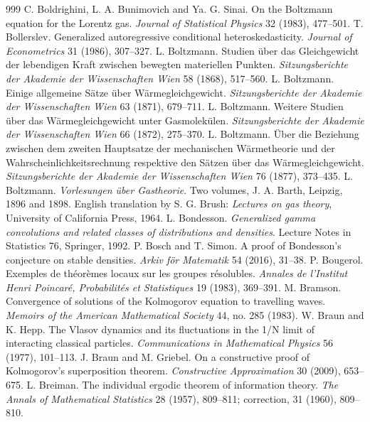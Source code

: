 \begin{thebibliography}{999}
 C. Boldrighini, L. A. Bunimovich and Ya. G. Sinai. On the Boltzmann equation for the Lorentz gas. \emph{Journal of Statistical Physics} 32 (1983), 477--501.
 T. Bollerslev. Generalized autoregressive conditional heteroskedasticity. \emph{Journal of Econometrics} 31 (1986), 307--327.
 L. Boltzmann. Studien \"uber das Gleichgewicht der lebendigen Kraft zwischen bewegten materiellen Punkten. \emph{Sitzungsberichte der Akademie der Wissenschaften Wien} 58 (1868), 517--560.
 L. Boltzmann. Einige allgemeine S\"atze \"uber W\"armegleichgewicht. \emph{Sitzungsberichte der Akademie der Wissenschaften Wien} 63 (1871), 679--711.
 L. Boltzmann. Weitere Studien \"uber das W\"armegleichgewicht unter Gasmolek\"ulen. \emph{Sitzungsberichte der Akademie der Wissenschaften Wien} 66 (1872), 275--370.
 L. Boltzmann. \"Uber die Beziehung zwischen dem zweiten Hauptsatze der mechanischen W\"armetheorie und der Wahrscheinlichkeitsrechnung respektive den S\"atzen \"uber das W\"armegleichgewicht. \emph{Sitzungsberichte der Akademie der Wissenschaften Wien} 76 (1877), 373--435.
 L. Boltzmann. \emph{Vorlesungen \"uber Gastheorie}. Two volumes, J. A. Barth, Leipzig, 1896 and 1898. English translation by S. G. Brush: \emph{Lectures on gas theory}, University of California Press, 1964.
 L. Bondesson. \emph{Generalized gamma convolutions and related classes of distributions and densities}. Lecture Notes in Statistics 76, Springer, 1992.
 P. Bosch and T. Simon. A proof of Bondesson's conjecture on stable densities. \emph{Arkiv f\"or Matematik} 54 (2016), 31--38.
 P. Bougerol. Exemples de th\'eor\`emes locaux sur les groupes r\'esolubles. \emph{Annales de l'Institut Henri Poincar\'e, Probabilit\'es et Statistiques} 19 (1983), 369--391.
 M. Bramson. Convergence of solutions of the Kolmogorov equation to travelling waves. \emph{Memoirs of the American Mathematical Society} 44, no. 285 (1983).
 W. Braun and K. Hepp. The Vlasov dynamics and its fluctuations in the 1/N limit of interacting classical particles. \emph{Communications in Mathematical Physics} 56 (1977), 101--113.
 J. Braun and M. Griebel. On a constructive proof of Kolmogorov's superposition theorem. \emph{Constructive Approximation} 30 (2009), 653--675.
 L. Breiman. The individual ergodic theorem of information theory. \emph{The Annals of Mathematical Statistics} 28 (1957), 809--811; correction, 31 (1960), 809--810.

\end{thebibliography}
